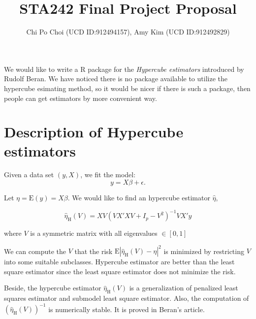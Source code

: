 \documentclass[draft]{article}
\title{STA242 Final Project Proposal}
\author{Chi Po Choi (UCD ID:912494157), Amy Kim (UCD ID:912492829)}
\begin{document}
\maketitle

We would like to write a R package for the \emph{Hypercube estimators} \cite{beran2014hypercube} introduced by Rudolf Beran. We have noticed there is no package available to utilize the hypercube esimating method, so it would be nicer if there is such a package, then people can get estimators by more convenient way. 

\section{Description of Hypercube estimators}

Given a data set $(y, X)$, we fit the model:
$$
y = X\beta + \epsilon.
$$

Let $\eta = \text{E}(y) = X\beta$. We would like to find an hypercube estimator $\hat{\eta}$,

$$
\hat{\eta}_\text{H} (V) = X V (V X'X V + I_p - V^2)^{-1} V X' y
$$

where $V$ is a symmetric matrix with all eigenvalues $\in [0,1]$

We can compute the $V$ that the risk $\text{E} | \hat{\eta}_\text{H}(V) - \eta|^2$ is minimized by restricting $V$ into some suitable subclasses. Hypercube estimator are better than the least square estimator since the least square estimator does not minimize the risk.

Beside, the hypercube estimator $\hat{\eta}_\text{H} (V)$ is a generalization of penalized least squares estimator and submodel least square estimator. Also, the computation of $(\hat{\eta}_\text{H} (V))^{-1}$ is numerically stable. It is proved in Beran's article\cite{beran2014hypercube}.
\end{document}
